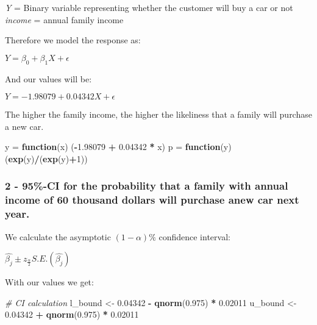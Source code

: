 \documentclass[]{article}
\newenvironment{Shaded}{\begin{snugshade}}{\end{snugshade}}
\newcommand{\CommentTok}[1]{\textcolor[rgb]{0.56,0.35,0.01}{\textit{#1}}}
\newcommand{\ControlFlowTok}[1]{\textcolor[rgb]{0.13,0.29,0.53}{\textbf{#1}}}
\newcommand{\DecValTok}[1]{\textcolor[rgb]{0.00,0.00,0.81}{#1}}
\newcommand{\FloatTok}[1]{\textcolor[rgb]{0.00,0.00,0.81}{#1}}
\newcommand{\KeywordTok}[1]{\textcolor[rgb]{0.13,0.29,0.53}{\textbf{#1}}}
\newcommand{\NormalTok}[1]{#1}
\newcommand{\OperatorTok}[1]{\textcolor[rgb]{0.81,0.36,0.00}{\textbf{#1}}}
\newcommand{\StringTok}[1]{\textcolor[rgb]{0.31,0.60,0.02}{#1}}
\begin{document}
\emph{Y} = Binary variable representing whether the customer will buy a
car or not \emph{income} = annual family income

Therefore we model the response as:

\(Y = \beta_{0} + \beta_{1} X + \epsilon\)

And our values will be:

\(Y = -1.98079 + 0.04342 X + \epsilon\)

The higher the family income, the higher the likeliness that a family
will purchase a new car.

\begin{Shaded}
\begin{Highlighting}[]
\NormalTok{y =}\StringTok{ }\ControlFlowTok{function}\NormalTok{(x) (}\OperatorTok{-}\FloatTok{1.98079} \OperatorTok{+}\StringTok{ }\FloatTok{0.04342} \OperatorTok{*}\StringTok{ }\NormalTok{x)}
\NormalTok{p =}\StringTok{ }\ControlFlowTok{function}\NormalTok{(y) (}\KeywordTok{exp}\NormalTok{(y)}\OperatorTok{/}\NormalTok{(}\KeywordTok{exp}\NormalTok{(y)}\OperatorTok{+}\DecValTok{1}\NormalTok{))}
\end{Highlighting}
\end{Shaded}

\hypertarget{ci-for-the-probability-that-a-family-with-annual-income-of-60-thousand-dollars-will-purchase-anew-car-next-year.}{%
\subsubsection{2 - 95\%-CI for the probability that a family with annual
income of 60 thousand dollars will purchase anew car next
year.}\label{ci-for-the-probability-that-a-family-with-annual-income-of-60-thousand-dollars-will-purchase-anew-car-next-year.}}

We calculate the asymptotic \((1 - \alpha)\%\) confidence interval:

\(\hat{\beta_{j}} \pm z_{\frac{\alpha}{2}} S.E. (\hat{\beta_{j}})\)

With our values we get:

\begin{Shaded}
\begin{Highlighting}[]
\CommentTok{# CI calculation}
\NormalTok{l_bound <-}\StringTok{ }\FloatTok{0.04342} \OperatorTok{-}\StringTok{ }\KeywordTok{qnorm}\NormalTok{(}\FloatTok{0.975}\NormalTok{) }\OperatorTok{*}\StringTok{ }\FloatTok{0.02011}
\NormalTok{u_bound <-}\StringTok{ }\FloatTok{0.04342} \OperatorTok{+}\StringTok{ }\KeywordTok{qnorm}\NormalTok{(}\FloatTok{0.975}\NormalTok{) }\OperatorTok{*}\StringTok{ }\FloatTok{0.02011}
\end{Highlighting}
\end{Shaded}
\end{document}
